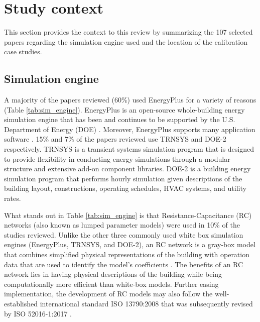 \documentclass[review]{elsarticle}
\begin{document}
\section{Study context} \label{sec:context}

This section provides the context to this review by summarizing the 107 selected papers regarding the simulation engine used and the location of the calibration case studies.

\subsection{Simulation engine}

A majority of the papers reviewed (60\%) used EnergyPlus for a variety of reasons (Table \ref{tab:sim_engine}). EnergyPlus is an open-source whole-building energy simulation engine that has been and continues to be supported by the U.S. Department of Energy (DOE) \cite{doe_energyplus}. Moreover, EnergyPlus supports many application software \cite{ibpsa_best}. 15\% and 7\% of the papers reviewed use TRNSYS and DOE-2 respectively. TRNSYS \cite{klein2017trnsys} is a transient systems simulation program that is designed to provide flexibility in conducting energy simulations through a modular structure and extensive add-on component libraries. DOE-2 \cite{doe2} is a building energy simulation program that performs hourly simulation given descriptions of the building layout, constructions, operating schedules, HVAC systems, and utility rates. 

What stands out in Table \ref{tab:sim_engine} is that Resistance-Capacitance (RC) networks (also known as lumped parameter models) were used in 10\% of the studies reviewed. Unlike the other three commonly used white box simulation engines (EnergyPlus, TRNSYS, and DOE-2), an RC network is a gray-box model that combines simplified physical representations of the building with operation data that are used to identify the model's coefficients \cite{li2014review}. The benefits of an RC network lies in having physical descriptions of the building while being computationally more efficient than white-box models. Further easing implementation, the development of RC models may also follow the well-established international standard ISO 13790:2008 \cite{iso13790energy} that was subsequently revised by ISO 52016-1:2017 \cite{iso52016energy}.
\end{document}
